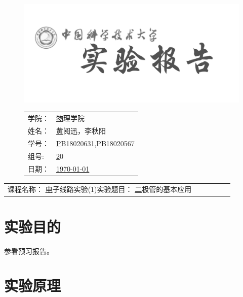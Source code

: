 \documentclass[a4paper,11pt,UTF8]{ctexart}
\newcommand{\major}{物理学院}
\newcommand{\name}{黄阅迅，李秋阳}
\newcommand{\stuid}{PB18020631,PB18020567}
\newcommand{\group}{20}
\newcommand{\newdate}{\today}
\newcommand{\course}{电子线路实验(1)}
\newcommand{\newtitle}{二极管的基本应用}
\begin{document}
\thispagestyle{empty}
\begin{figure}[h]
  \begin{minipage}{0.6\linewidth}
    \centerline{\includegraphics[width=\linewidth]{logo.png}}
  \end{minipage}
  \hfill
  \begin{minipage}{.4\linewidth}
    \raggedleft
    \begin{tabular*}{.8\linewidth}{ll}
      学院： & \underline\major   \\
      姓名： & \underline\name    \\
      学号： & \underline\stuid   \\
      组号:  & \underline\group   \\
      日期： & \underline\newdate \\
    \end{tabular*}
  \end{minipage}
\end{figure}

\begin{table}[!htbp]
  \centering
  \begin{tabular*}{\linewidth}{llllll}
    课程名称：  \underline\course   \qquad\qquad 实验题目：  \underline\newtitle  
  \end{tabular*}
\end{table}

%
\newcommand\mr[1]{\mathrm{#1}}
\newcommand\dd{\mathrm{d\,}}

\section{实验目的}

参看预习报告。

\section{实验原理}
\end{document}
